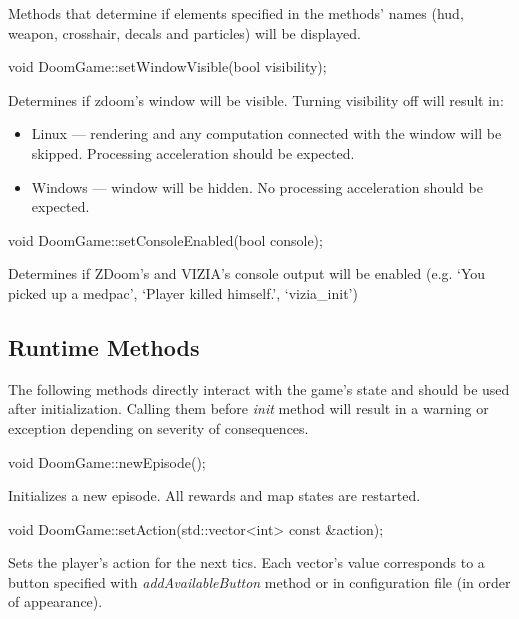 \documentclass[english,bachelor,a4paper,twoside]{ppfcmthesis}
\begin{document}
	Methods that determine if elements specified in the methods' names (hud, weapon, crosshair, decals and particles) will be displayed.


\vspace{20pt}
\begin{clinee}
void DoomGame::setWindowVisible(bool visibility);
\end{clinee}

	Determines if zdoom's window will be visible. Turning visibility off will result in:
	\begin{itemize}
		\item Linux --- rendering and any computation connected with the window will be skipped. Processing acceleration should be expected.
		\item Windows --- window will be hidden. No processing acceleration should be expected.
	\end{itemize}


\vspace{20pt}
\begin{clinee}
void DoomGame::setConsoleEnabled(bool console);
\end{clinee}

	Determines if ZDoom's and VIZIA's console output will be enabled (e.g. `You picked up a medpac', `Player killed himself.', `vizia\_init')


\vspace{20pt}
\subsection{Runtime Methods}\label{subsec:runtime_methods}
	The following methods directly interact with the game's state and should be used after initialization. Calling them before \emph{init} method will result in a warning or exception depending on severity of consequences. 

\vspace{20pt}
\begin{clinee}
void DoomGame::newEpisode();
\end{clinee}

	Initializes a new episode. All rewards and map states are restarted.


\vspace{20pt}
\begin{clinee}
	void DoomGame::setAction(std::vector<int> const &action);
\end{clinee}

	Sets the player's action for the next tics.
	Each vector's value corresponds to a button specified with \emph{addAvailableButton} method or in configuration file (in order of appearance).
\end{document}
